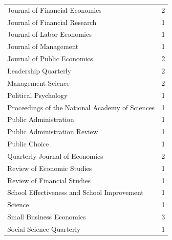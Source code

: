 \documentclass[english]{article}
\begin{document}
\begin{appendices}
\begin{table}
{\begin{tabular}{lc}
	Journal of Financial Economics                                    &      2           \\
	Journal of Financial Research                                     &      1           \\
	Journal of Labor Economics                                        &      1           \\
	Journal of Management                                             &      1           \\
	Journal of Public Economics                                       &      2           \\
	Leadership Quarterly                                              &      2           \\
	Management Science                                                &      2           \\
	Political Psychology                                              &      1           \\
	Proceedings of the National Academy of Sciences                   &      1           \\
	Public Administration                                             &      1           \\
	Public Administration Review                                      &      1           \\
	Public Choice                                                     &      1           \\
	Quarterly Journal of Economics                                    &      2           \\
	Review of Economic Studies                                        &      1           \\
	Review of Financial Studies                                       &      1           \\
	School Effectiveness and School Improvement                       &      1           \\
	Science                                                           &      1           \\
	Small Business Economics                                          &      3           \\
	Social Science Quarterly                                          &      1           \\
	\bottomrule
	\end{tabular}}
	\label{tab:count_by_journal}
\end{table}


\end{appendices}
\end{document}
